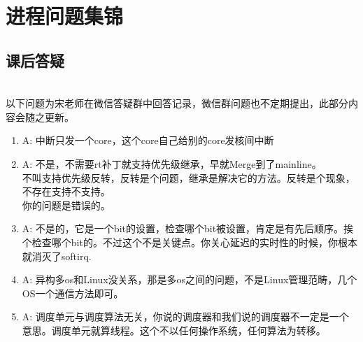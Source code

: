 

\partabstractfp{}
\partabstractrp{}

\part{进程问题集锦}

\chapter{课后答疑}


~\\以下问题为宋老师在微信答疑群中回答记录，微信群问题也不定期提出，此部分内容会随之更新。
\begin{enumerate}
  \item
\begin{tcolorbox}[colback=green!5,colframe=green!75!black]
\tcblower
A: 中断只发一个core，这个core自己给别的core发核间中断
\end{tcolorbox}

  \item
\begin{tcolorbox}[colback=green!5,colframe=green!75!black]
\tcblower
A: 不是，不需要rt补丁就支持优先级继承，早就Merge到了mainline。\\
不叫支持优先级反转，反转是个问题，继承是解决它的方法。反转是个现象，不存在支持不支持。\\
你的问题是错误的。
\end{tcolorbox}


  \item
\begin{tcolorbox}[colback=green!5,colframe=green!75!black]
\tcblower
A: 不是的，它是一个bit的设置，检查哪个bit被设置，肯定是有先后顺序。挨个检查哪个bit的。不过这个不是关键点。你关心延迟的实时性的时候，你根本就消灭了softirq.
\end{tcolorbox}

  \item
\begin{tcolorbox}[colback=green!5,colframe=green!75!black]
\tcblower
A: 异构多os和Linux没关系，那是多os之间的问题，不是Linux管理范畴，几个OS一个通信方法即可。
\end{tcolorbox}

  \item
\begin{tcolorbox}[colback=green!5,colframe=green!75!black]
\tcblower
A: 调度单元与调度算法无关，你说的调度器和我们说的调度器不一定是一个意思。调度单元就算线程。这个不以任何操作系统，任何算法为转移。
\end{tcolorbox}




\end{enumerate}

